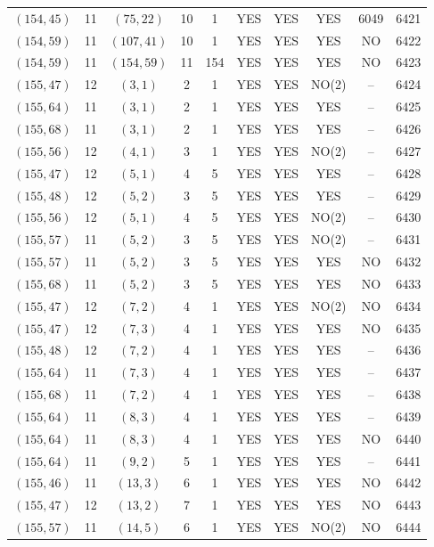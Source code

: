 \begin{longtable}{|c|c|c|c|c|c|c|c|c|c|}
$(154, 45)$ & 11 & $(75, 22)$ & 10 & 1 & YES & YES & YES & 6049 & 6421\\
$(154, 59)$ & 11 & $(107, 41)$ & 10 & 1 & YES & YES & YES & NO & 6422\\
$(154, 59)$ & 11 & $(154, 59)$ & 11 & 154 & YES & YES & YES & NO & 6423\\
$(155, 47)$ & 12 & $(3, 1)$ & 2 & 1 & YES & YES & NO(2) & -- & 6424\\
$(155, 64)$ & 11 & $(3, 1)$ & 2 & 1 & YES & YES & YES & -- & 6425\\
$(155, 68)$ & 11 & $(3, 1)$ & 2 & 1 & YES & YES & YES & -- & 6426\\
$(155, 56)$ & 12 & $(4, 1)$ & 3 & 1 & YES & YES & NO(2) & -- & 6427\\
$(155, 47)$ & 12 & $(5, 1)$ & 4 & 5 & YES & YES & YES & -- & 6428\\
$(155, 48)$ & 12 & $(5, 2)$ & 3 & 5 & YES & YES & YES & -- & 6429\\
$(155, 56)$ & 12 & $(5, 1)$ & 4 & 5 & YES & YES & NO(2) & -- & 6430\\
$(155, 57)$ & 11 & $(5, 2)$ & 3 & 5 & YES & YES & NO(2) & -- & 6431\\
$(155, 57)$ & 11 & $(5, 2)$ & 3 & 5 & YES & YES & YES & NO & 6432\\
$(155, 68)$ & 11 & $(5, 2)$ & 3 & 5 & YES & YES & YES & NO & 6433\\
$(155, 47)$ & 12 & $(7, 2)$ & 4 & 1 & YES & YES & NO(2) & NO & 6434\\
$(155, 47)$ & 12 & $(7, 3)$ & 4 & 1 & YES & YES & YES & NO & 6435\\
$(155, 48)$ & 12 & $(7, 2)$ & 4 & 1 & YES & YES & YES & -- & 6436\\
$(155, 64)$ & 11 & $(7, 3)$ & 4 & 1 & YES & YES & YES & -- & 6437\\
$(155, 68)$ & 11 & $(7, 2)$ & 4 & 1 & YES & YES & YES & -- & 6438\\
$(155, 64)$ & 11 & $(8, 3)$ & 4 & 1 & YES & YES & YES & -- & 6439\\
$(155, 64)$ & 11 & $(8, 3)$ & 4 & 1 & YES & YES & YES & NO & 6440\\
$(155, 64)$ & 11 & $(9, 2)$ & 5 & 1 & YES & YES & YES & -- & 6441\\
$(155, 46)$ & 11 & $(13, 3)$ & 6 & 1 & YES & YES & YES & NO & 6442\\
$(155, 47)$ & 12 & $(13, 2)$ & 7 & 1 & YES & YES & YES & NO & 6443\\
$(155, 57)$ & 11 & $(14, 5)$ & 6 & 1 & YES & YES & NO(2) & NO & 6444\\

\end{longtable}
